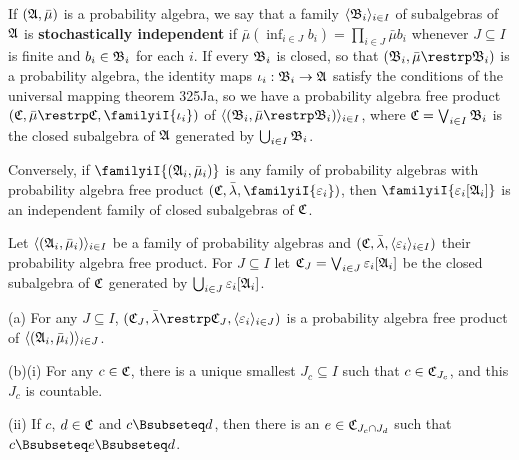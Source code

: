  If $(\frak A,\bar\mu)$ is a
probability algebra, we say that a family
$\langle\frak B_i\rangle_{i\in I}$ of subalgebras of $\frak A$ is
{\bf stochastically independent} if
$\bar\mu(\inf_{i\in J}b_i)=\prod_{i\in J}\bar\mu b_i$ whenever
$J\subseteq I$ is finite and $b_i\in\frak B_i$ for each $i$.
   If every $\frak B_i$ is closed, so that
$(\frak B_i,\bar\mu\restrp\frak B_i)$ is a probability algebra,
the identity maps $\iota_i:\frak B_i\to\frak A$
satisfy the conditions of the universal mapping theorem 325Ja,
so we have a probability algebra free product
$(\frak C,\bar\mu\restrp\frak C,\familyiI{\iota_i})$ of
$\langle(\frak B_i,\bar\mu\restrp\frak B_i)\rangle_{i\in I}$, where
$\frak C=\bigvee_{i\in I}\frak B_i$ is the closed subalgebra
of $\frak A$ generated by $\bigcup_{i\in I}\frak B_i$.

Conversely, if $\familyiI{(\frak A_i,\bar\mu_i)}$ is any family of
probability algebras with probability algebra free product
$(\frak C,\bar\lambda,\familyiI{\varepsilon_i})$, then
$\familyiI{\varepsilon_i[\frak A_i]}$ is an independent family of
closed subalgebras of $\frak C$.   


 Let
$\langle(\frak A_i,\bar\mu_i)\rangle_{i\in I}$ be a family of
probability algebras and
$(\frak C,\bar\lambda,\langle\varepsilon_i\rangle_{i\in I})$ their probability
algebra free product.   For
$J\subseteq I$ let $\frak C_J=\bigvee_{i\in J}\varepsilon_i[\frak A_i]$
be the closed subalgebra of $\frak C$
generated by $\bigcup_{i\in J}\varepsilon_i[\frak A_i]$.

(a) For any $J\subseteq I$,
$(\frak C_J,\bar\lambda\restrp\frak C_J,
   \langle\varepsilon_i\rangle_{i\in J})$
is a probability algebra free product of
$\langle(\frak A_i,\bar\mu_i)\rangle_{i\in J}$.

(b)(i)  For any $c\in\frak C$, there is a unique smallest $J_c\subseteq I$
such that $c\in\frak C_{J_c}$, and this $J_c$ is countable.

\quad(ii)
If $c$, $d\in\frak C$ and $c\Bsubseteq d$, then there is an
$e\in\frak C_{J_c\cap J_d}$ such that $c\Bsubseteq e\Bsubseteq d$.


